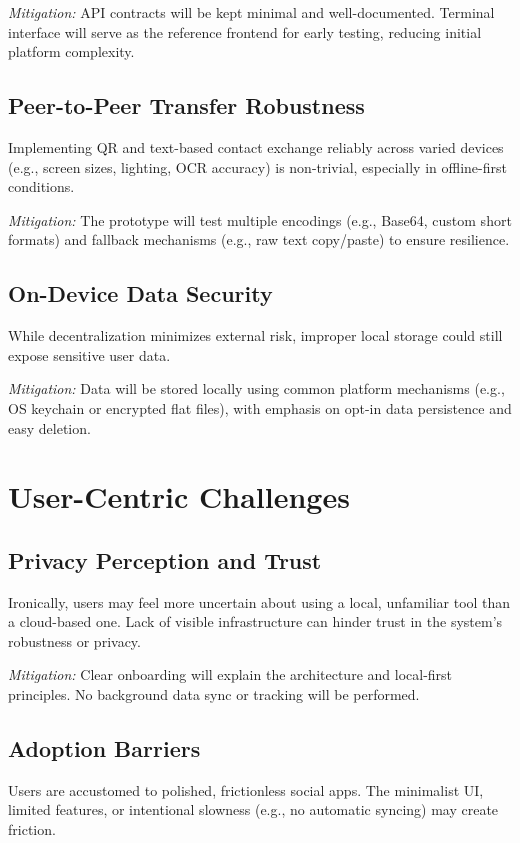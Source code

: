 \documentclass{imc-inf}
\begin{document}
\textit{Mitigation:} API contracts will be kept minimal and well-documented. Terminal interface will serve as the reference frontend for early testing, reducing initial platform complexity.

\subsection*{Peer-to-Peer Transfer Robustness}
Implementing QR and text-based contact exchange reliably across varied devices (e.g., screen sizes, lighting, OCR accuracy) is non-trivial, especially in offline-first conditions.

\textit{Mitigation:} The prototype will test multiple encodings (e.g., Base64, custom short formats) and fallback mechanisms (e.g., raw text copy/paste) to ensure resilience.

\subsection*{On-Device Data Security}
While decentralization minimizes external risk, improper local storage could still expose sensitive user data.

\textit{Mitigation:} Data will be stored locally using common platform mechanisms (e.g., OS keychain or encrypted flat files), with emphasis on opt-in data persistence and easy deletion.

\section{User-Centric Challenges}

\subsection*{Privacy Perception and Trust}
Ironically, users may feel more uncertain about using a local, unfamiliar tool than a cloud-based one. Lack of visible infrastructure can hinder trust in the system’s robustness or privacy.

\textit{Mitigation:} Clear onboarding will explain the architecture and local-first principles. No background data sync or tracking will be performed.

\subsection*{Adoption Barriers}
Users are accustomed to polished, frictionless social apps. The minimalist UI, limited features, or intentional slowness (e.g., no automatic syncing) may create friction.
\end{document}
